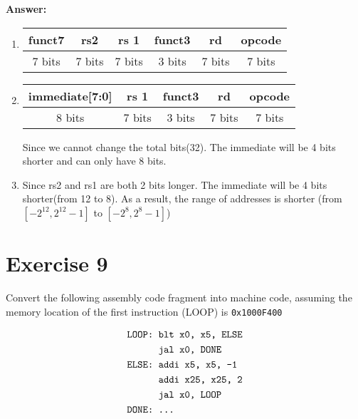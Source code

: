 \documentclass[11pt,a4paper]{article}
\begin{document}
\textbf{Answer:}

\begin{enumerate}[1)]
    \item 
    \begin{center}
\begin{tabular}{|c|c|c|c|c|c|}
\hline funct7 & rs2 & rs 1 & funct3 & rd & opcode \\
\hline 7 bits & 7 bits & 7 bits & 3 bits & 7 bits & 7 bits\\
\hline
\end{tabular}
    \end{center}
    
    \item 
    \begin{center}
\begin{tabular}{|c|c|c|c|c|}
\hline immediate[7:0] & rs 1 & funct3 & rd & opcode \\
\hline 8 bits & 7 bits & 3 bits & 7 bits & 7 bits\\
\hline
\end{tabular}
    \end{center}
    Since we cannot change the total bits(32). The immediate will be 4 bits shorter and can only have 8 bits.
    \item Since rs2 and rs1 are both 2 bits longer. The immediate will be 4 bits shorter(from 12 to 8). As a result, the range of addresses is shorter (from $[-2^{12}, 2^{12}-1]$ to $[-2^{8}, 2^{8}-1]$)
\end{enumerate}

\section*{Exercise 9}

Convert the following assembly code fragment into machine code, assuming the
memory location of the first instruction (LOOP) is \verb|0x1000F400|

$$
\begin{aligned}
\verb|LOOP: | & \verb|blt x0, x5, ELSE|\\
&\verb|jal x0, DONE|\\
\verb|ELSE: | & \verb|addi x5, x5, -1|\\
&\verb|addi x25, x25, 2|\\
&\verb|jal x0, LOOP|\\
\verb|DONE: | & \verb|...|\\
\end{aligned}
$$


\vspace{0.3cm}
\end{document}
